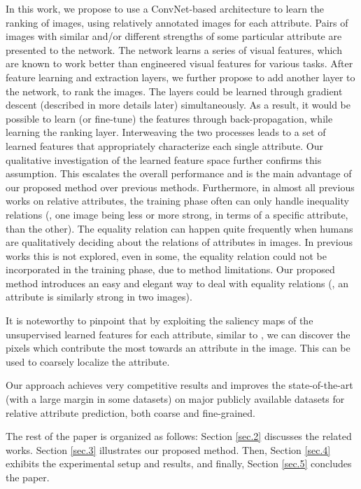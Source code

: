 In this work, we propose to use a ConvNet-based architecture to learn the ranking of images, using relatively annotated images for each attribute. Pairs of images with similar and/or different strengths of some particular attribute are presented to the network. The network learns a series of visual features, which are known to work better than engineered visual features \cite{offtheshelf} for various tasks. After feature learning and extraction layers, we further propose to add another layer to the network, to rank the images. The layers could be learned through gradient descent (described in more details later) simultaneously. As a result, it would be possible to learn (or fine-tune) the features through back-propagation, while learning the ranking layer.
Interweaving the two processes leads to a set of learned features that appropriately characterize each single attribute. Our qualitative investigation of the learned feature space further confirms this assumption. This escalates the overall performance and is the main advantage of our proposed method over previous methods. Furthermore, in almost all previous works on relative attributes, the training phase often can only handle inequality relations (\ie, one image being less or more strong, in terms of a specific attribute, than the other). The equality relation can happen quite frequently when humans are qualitatively deciding about the relations of attributes in images. In previous works this is not explored, even in some, the equality relation could not be incorporated in the training phase, due to method limitations. Our proposed method introduces an easy and elegant way to deal with equality relations (\ie, an attribute is similarly strong in two images).

It is noteworthy to pinpoint that by exploiting the saliency maps of the unsupervised learned features for each attribute, similar to \cite{saliency}, we can discover the pixels which contribute the most towards an attribute in the image. This can be used to coarsely localize the attribute.

Our approach achieves very competitive results and improves the state-of-the-art (with a large margin in some datasets) on major publicly available datasets for relative attribute prediction, both coarse and fine-grained.

The rest of the paper is organized as follows: Section \ref{sec.2} discusses the related works. Section \ref{sec.3} illustrates our proposed method. Then, Section \ref{sec.4} exhibits the experimental setup and results, and finally, Section \ref{sec.5} concludes the paper.
